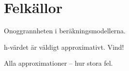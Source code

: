 \section{Felkällor}\label{sec:errors}


Onoggrannheten i beräkningsmodellerna.

h-värdet är väldigt approximativt. Vind!

Alla approximationer – hur stora fel.



